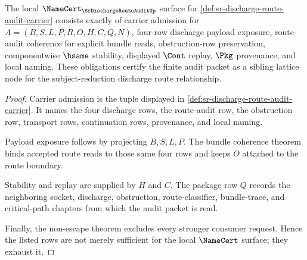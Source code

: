 \begin{theorem}
\label{thm:sr-discharge-route-audit-namecert-obligations}
The local $\NameCert_{\SrDischargeRouteAuditUp}$ surface for \autoref{def:sr-discharge-route-audit-carrier} consists exactly of carrier admission for $A=(B,S,L,P,R,O,H,C,Q,N)$, four-row discharge payload exposure, route-audit coherence for explicit bundle reads, obstruction-row preservation, componentwise $\hsame$ stability, displayed $\Cont$ replay, $\Pkg$ provenance, and local naming. These obligations certify the finite audit packet as a sibling lattice node for the subject-reduction discharge route relationship.
\end{theorem}
\begin{proof}
Carrier admission is the tuple displayed in \autoref{def:sr-discharge-route-audit-carrier}. It names the four discharge rows, the route-audit row, the obstruction row, transport rows, continuation rows, provenance, and local naming.

Payload exposure follows by projecting $B,S,L,P$. The bundle coherence theorem binds accepted route reads to those same four rows and keeps $O$ attached to the route boundary.

Stability and replay are supplied by $H$ and $C$. The package row $Q$ records the neighboring socket, discharge, obstruction, route-classifier, bundle-trace, and critical-path chapters from which the audit packet is read.

Finally, the non-escape theorem excludes every stronger consumer request. Hence the listed rows are not merely sufficient for the local $\NameCert$ surface; they exhaust it.
\end{proof}


\begin{closurestatus}{\SrDischargeRouteAuditUp}
  \theoryclosure{\seedClosure}
  \formalstatus{\unformalizedV}
\end{closurestatus}

